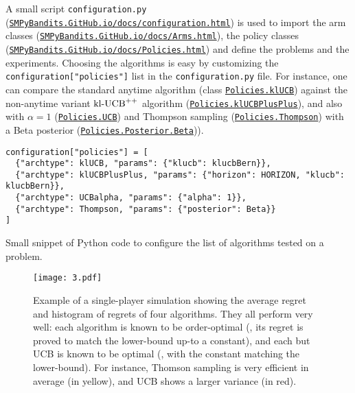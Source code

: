 A small script \texttt{configuration.py} (\texttt{\href{https://SMPyBandits.GitHub.io/docs/configuration.html}{SMPyBandits.GitHub.io/docs/configuration.html}}) is used to import the arm classes (\texttt{\href{https://SMPyBandits.GitHub.io/docs/Arms.html}{SMPyBandits.GitHub.io/docs/Arms.html}}), the policy classes (\texttt{\href{https://SMPyBandits.GitHub.io/docs/Policies.html}{SMPyBandits.GitHub.io/docs/Policies.html}}) and define the problems and the experiments.
Choosing the algorithms is easy by customizing the \texttt{configuration["policies"]} list in the \texttt{configuration.py} file.
For instance, one can compare the standard anytime \klUCB{} algorithm (class \texttt{\href{https://SMPyBandits.GitHub.io/docs/Policies.klUCB.html}{Policies.klUCB}}) against the non-anytime variant $\mathrm{kl}\text{-}\mathrm{UCB}^{++}$ algorithm (\texttt{\href{https://SMPyBandits.GitHub.io/docs/Policies.klUCBPlusPlus.html}{Policies.klUCBPlusPlus}}), and also \UCB{} with $\alpha=1$ (\texttt{\href{https://SMPyBandits.GitHub.io/docs/Policies.UCBalpha.html}{Policies.UCB}}) and Thompson sampling (\texttt{\href{https://SMPyBandits.GitHub.io/docs/Policies.Thompson.html}{Policies.Thompson}}) with a Beta posterior (\texttt{\href{https://SMPyBandits.GitHub.io/docs/Policies.Posterior.Beta.html}{Policies.Posterior.Beta}})).

\begin{small}
\begin{listing}[h!]
    \begin{verbatim}
configuration["policies"] = [
  {"archtype": klUCB, "params": {"klucb": klucbBern}},
  {"archtype": klUCBPlusPlus, "params": {"horizon": HORIZON, "klucb": klucbBern}},
  {"archtype": UCBalpha, "params": {"alpha": 1}},
  {"archtype": Thompson, "params": {"posterior": Beta}}
]
    \end{verbatim}
    \caption{Small snippet of Python code to configure the list of algorithms tested on a problem.}
    \label{lst:3:howToConfigureAlgorithms}
\end{listing}
\end{small}

\begin{figure}[h!]  %
	\texttt{[image: 3.pdf]}
	\caption[Example of a single-player simulation showing the average regret and histogram of regrets of $4$ algorithms]{
		Example of a single-player simulation showing the average regret and histogram of regrets of four algorithms. They all perform very well: each algorithm is known to be order-optimal (\ie, its regret is proved to match the lower-bound up-to a constant), and each but UCB is known to be optimal (\ie, with the constant matching the lower-bound). For instance, Thomson sampling is very efficient in average (in yellow), and UCB shows a larger variance (in red).
	}
	\label{fig:3:firstPlot}
\end{figure}

